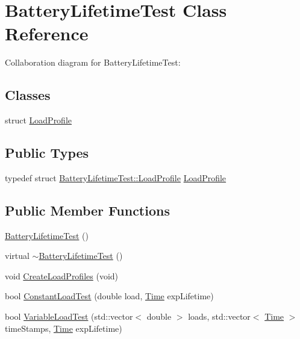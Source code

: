 \hypertarget{classBatteryLifetimeTest}{}\section{Battery\+Lifetime\+Test Class Reference}
\label{classBatteryLifetimeTest}


Collaboration diagram for Battery\+Lifetime\+Test\+:
\subsection*{Classes}
\begin{DoxyCompactItemize}
\item 
struct \hyperlink{structBatteryLifetimeTest_1_1LoadProfile}{Load\+Profile}
\end{DoxyCompactItemize}
\subsection*{Public Types}
\begin{DoxyCompactItemize}
\item 
typedef struct \hyperlink{structBatteryLifetimeTest_1_1LoadProfile}{Battery\+Lifetime\+Test\+::\+Load\+Profile} \hyperlink{classBatteryLifetimeTest_a0a7dbe56f76bd35b61e1c8477c07d42d}{Load\+Profile}
\end{DoxyCompactItemize}
\subsection*{Public Member Functions}
\begin{DoxyCompactItemize}
\item 
\hyperlink{classBatteryLifetimeTest_a4f42f600692c89a36c3bbf2861046853}{Battery\+Lifetime\+Test} ()
\item 
virtual \hyperlink{classBatteryLifetimeTest_a44a19773e16a381b5d4e4e4648e99b52}{$\sim$\+Battery\+Lifetime\+Test} ()
\item 
void \hyperlink{classBatteryLifetimeTest_a5987a9b8efd2a8e594f52d2b8ba6af63}{Create\+Load\+Profiles} (void)
\item 
bool \hyperlink{classBatteryLifetimeTest_a5cfb6c588872035454feb525491b1d52}{Constant\+Load\+Test} (double load, \hyperlink{classns3_1_1Time}{Time} exp\+Lifetime)
\item 
bool \hyperlink{classBatteryLifetimeTest_aa6d0fb55387831f97d9834c47abfd669}{Variable\+Load\+Test} (std\+::vector$<$ double $>$ loads, std\+::vector$<$ \hyperlink{classns3_1_1Time}{Time} $>$ time\+Stamps, \hyperlink{classns3_1_1Time}{Time} exp\+Lifetime)
\end{DoxyCompactItemize}

